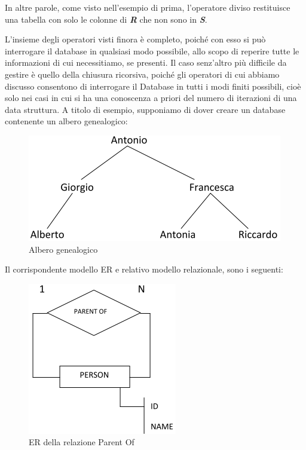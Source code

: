 \begin{itemize}
In altre parole, come visto nell’esempio di prima, l’operatore diviso restituisce una tabella con solo le colonne di \textit{\textbf{R}} che non sono in \textit{\textbf{S}}.

\end{itemize}

L’insieme degli operatori visti finora  è completo, poiché con esso si può interrogare il database in qualsiasi modo possibile, allo scopo di reperire tutte le informazioni di cui necessitiamo, se presenti. Il caso senz’altro più difficile da gestire è quello della chiusura ricorsiva, poiché gli operatori di cui abbiamo discusso consentono di interrogare il Database in tutti i modi finiti possibili, cioè solo nei casi in cui si ha una conoscenza a priori del numero di iterazioni di una data struttura. 
A titolo di esempio, supponiamo di dover creare un database contenente un albero genealogico: 

\begin{center}
\begin{figure}[H]
\centering
\includegraphics[scale=1]{figures/gen_tree.png}
\caption{Albero genealogico} 
\end{figure}
\end{center}

Il corrispondente modello ER e relativo modello relazionale, sono i seguenti:  

\begin{center}
\begin{figure}[H]
\centering
\includegraphics[scale=1]{figures/parent_of.png}
\caption{ER della relazione Parent Of} 
\end{figure}
\end{center}

